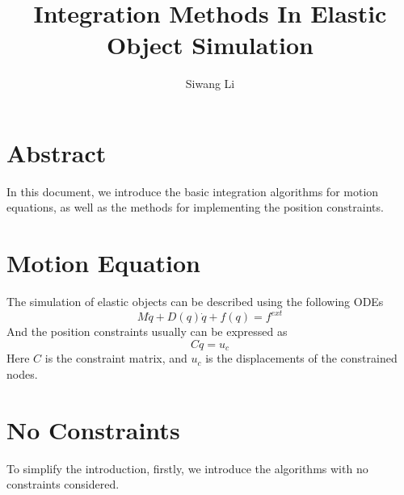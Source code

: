 \documentclass[twocolumn]{article}
\author{Siwang Li}
\title{Integration Methods In Elastic Object Simulation}
\begin{document}
\maketitle

\section{Abstract}
In this document, we introduce the basic integration algorithms for motion
equations, as well as the methods for implementing the position constraints. 

\section{Motion Equation}
The simulation of elastic objects can be described using the following ODEs 
\begin{equation} \label{motion_eq}
  M\ddot{q} + D(q)\dot{q} + f(q) = f^{ext}
\end{equation}
And the position constraints usually can be expressed as
\begin{equation} \label{postion_con}
{C} q = u_c
\end{equation}
Here ${C}$ is the constraint matrix, and $u_c$ is the displacements of the
constrained nodes.

\section{No Constraints}
To simplify the introduction, firstly, we introduce the algorithms with no
constraints considered.
\end{document}

